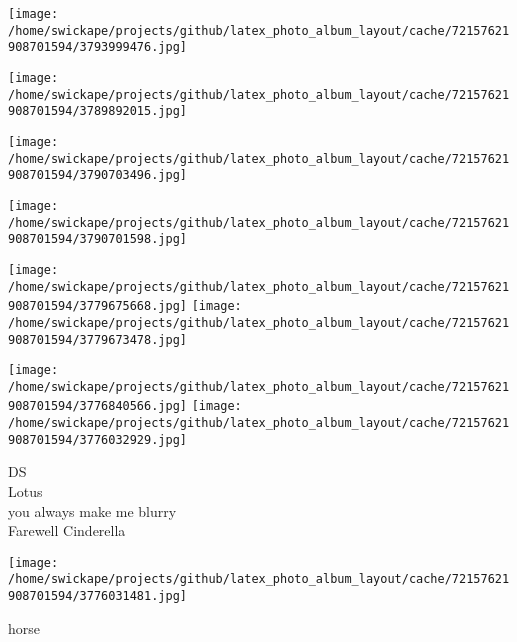 \documentclass[10pt,letterpaper]{article}
\begin{document}
\pagebreak

\texttt{[image: /home/swickape/projects/github/latex\_photo\_album\_layout/cache/72157621908701594/3793999476.jpg]}

\vspace{0.25in}
\texttt{[image: /home/swickape/projects/github/latex\_photo\_album\_layout/cache/72157621908701594/3789892015.jpg]}



\pagebreak

\texttt{[image: /home/swickape/projects/github/latex\_photo\_album\_layout/cache/72157621908701594/3790703496.jpg]}

\vspace{0.25in}
\texttt{[image: /home/swickape/projects/github/latex\_photo\_album\_layout/cache/72157621908701594/3790701598.jpg]}



\pagebreak

\texttt{[image: /home/swickape/projects/github/latex\_photo\_album\_layout/cache/72157621908701594/3779675668.jpg]}
\texttt{[image: /home/swickape/projects/github/latex\_photo\_album\_layout/cache/72157621908701594/3779673478.jpg]}

\texttt{[image: /home/swickape/projects/github/latex\_photo\_album\_layout/cache/72157621908701594/3776840566.jpg]}
\texttt{[image: /home/swickape/projects/github/latex\_photo\_album\_layout/cache/72157621908701594/3776032929.jpg]}

DS\\
Lotus\\
you always make me blurry\\
Farewell Cinderella
\pagebreak

\texttt{[image: /home/swickape/projects/github/latex\_photo\_album\_layout/cache/72157621908701594/3776031481.jpg]}

horse
\pagebreak
\end{document}
